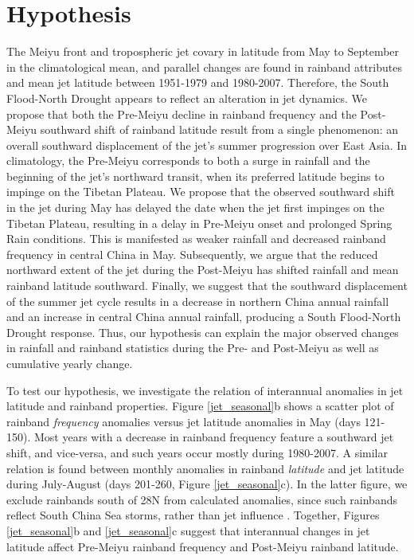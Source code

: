 \section{Hypothesis}

	The Meiyu front and tropospheric jet covary in latitude from May to September in the climatological mean, and parallel changes are found in rainband attributes and mean jet latitude between 1951-1979 and 1980-2007. Therefore, the South Flood-North Drought appears to reflect an alteration in jet dynamics. We propose that both the Pre-Meiyu decline in rainband frequency and the Post-Meiyu southward shift of rainband latitude result from a single phenomenon: an overall southward displacement of the jet's summer progression over East Asia. In climatology, the Pre-Meiyu corresponds to both a surge in rainfall and the beginning of the jet's northward transit, when its preferred latitude begins to impinge on the Tibetan Plateau. We propose that the observed southward shift in the jet during May has delayed the date when the jet first impinges on the Tibetan Plateau, resulting in a delay in Pre-Meiyu onset and prolonged Spring Rain conditions. This is manifested as weaker rainfall and decreased rainband frequency in central China in May. Subsequently, we argue that the reduced northward extent of the jet during the Post-Meiyu has shifted rainfall and mean rainband latitude southward. Finally, we suggest that the southward displacement of the summer jet cycle results in a decrease in northern China annual rainfall and an increase in central China annual rainfall, producing a South Flood-North Drought response. Thus, our hypothesis can explain the major observed changes in rainfall and rainband statistics during the Pre- and Post-Meiyu as well as cumulative yearly change.
	
	To test our hypothesis, we investigate the relation of interannual anomalies in jet latitude and rainband properties. Figure \ref{jet_seasonal}b shows a scatter plot of rainband \textit{frequency} anomalies versus jet latitude anomalies in May (days 121-150). Most years with a decrease in rainband frequency feature a southward jet shift, and vice-versa, and such years occur mostly during 1980-2007. A similar relation is found between monthly anomalies in rainband \textit{latitude} and jet latitude during July-August (days 201-260, Figure \ref{jet_seasonal}c). In the latter figure, we exclude rainbands south of 28\textdegree N from calculated anomalies, since such rainbands reflect South China Sea storms, rather than jet influence \citep{Day2015}. Together, Figures \ref{jet_seasonal}b and \ref{jet_seasonal}c suggest that interannual changes in jet latitude affect Pre-Meiyu rainband frequency and Post-Meiyu rainband latitude.

